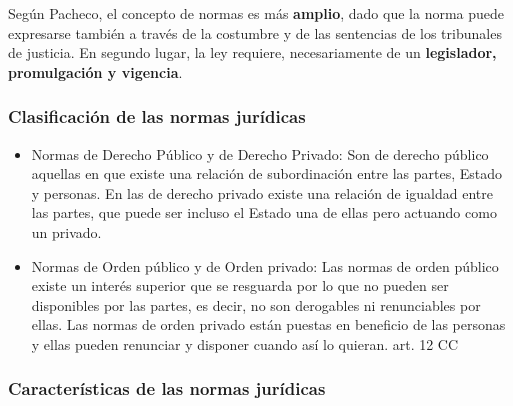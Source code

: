\documentclass[]{article}
\providecommand{\tightlist}{%
  \setlength{\itemsep}{0pt}\setlength{\parskip}{0pt}}
\begin{document}
Según Pacheco, el concepto de normas es más \textbf{amplio}, dado que la
norma puede expresarse también a través de la costumbre y de las
sentencias de los tribunales de justicia. En segundo lugar, la ley
requiere, necesariamente de un \textbf{legislador, promulgación y
vigencia}.

\hypertarget{clasificaciuxf3n-de-las-normas-juruxeddicas}{%
\subsubsection{Clasificación de las normas
jurídicas}\label{clasificaciuxf3n-de-las-normas-juruxeddicas}}

\begin{itemize}
\tightlist
\item
  Normas de Derecho Público y de Derecho Privado: Son de derecho público
  aquellas en que existe una relación de subordinación entre las partes,
  Estado y personas. En las de derecho privado existe una relación de
  igualdad entre las partes, que puede ser incluso el Estado una de
  ellas pero actuando como un privado.
\item
  Normas de Orden público y de Orden privado: Las normas de orden
  público existe un interés superior que se resguarda por lo que no
  pueden ser disponibles por las partes, es decir, no son derogables ni
  renunciables por ellas. Las normas de orden privado están puestas en
  beneficio de las personas y ellas pueden renunciar y disponer cuando
  así lo quieran. art. 12 CC
\end{itemize}

\hypertarget{caracteruxedsticas-de-las-normas-juruxeddicas}{%
\subsubsection{Características de las normas
jurídicas}\label{caracteruxedsticas-de-las-normas-juruxeddicas}}
\end{document}

